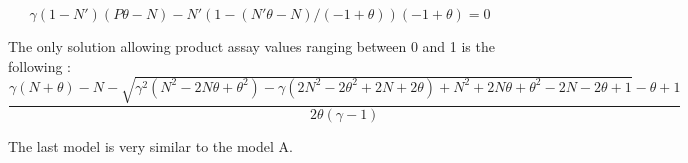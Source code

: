 \begin{equation}\label{eq:gamma_p}
\gamma(1-N')(P\theta-N) - N'(1-(N'\theta-N)/(-1+\theta))(-1+\theta) = 0
\end{equation}

The only solution allowing product assay values ranging between 0 and 1 is the
following :
\begin{equation}\label{eq:model_b_sol}
    \frac{\gamma(N + \theta) - N 
            - \sqrt{\gamma^2(N^2 
                            - 2N\theta 
                            + \theta^2) 
                    - \gamma(2N^2 - 2\theta^2 
                            + 2N + 2\theta) 
                    + N^2 + 2N\theta + \theta^2 - 2N - 2\theta + 1} 
            - \theta + 1}
        {2\theta(\gamma - 1)}
\end{equation}

The last model is very similar to the model A.


